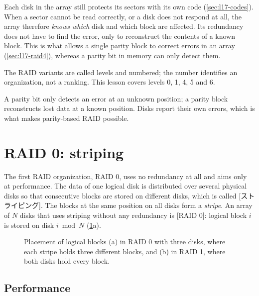 \documentclass[../main.tex]{subfiles}
\begin{document}
Each disk in the array still protects its sectors with its own code
(\cref{sec:l17-codes}).  When a sector cannot be read correctly, or a disk
does not respond at all, the array therefore \emph{knows which} disk and
which block are affected.  Its redundancy does not have to find the error,
only to reconstruct the contents of a known block.  This is what allows a
single parity block to correct errors in an array (\cref{sec:l17-raid4}),
whereas a parity bit in memory can only detect them.

The RAID variants are called levels and numbered; the number identifies an
organization, not a ranking.  This lesson covers levels 0, 1, 4, 5 and 6.

\begin{keypoint}
  A parity bit only detects an error at an unknown position; a parity block
  reconstructs lost data at a known position.  Disks report their own
  errors, which is what makes parity-based RAID possible.
\end{keypoint}

\section{RAID 0: striping}
\label{sec:l17-raid0}

The first RAID organization, RAID 0, uses no redundancy at all and aims only
at performance.  The data of one
logical disk is distributed over several physical disks so that consecutive
blocks are stored on different disks, which is called
[ストライピング].  The blocks at the same position on all
disks form a \emph{stripe}.  An array of $N$ disks that uses striping without
any redundancy is [RAID 0]: logical block $i$ is stored on disk
$i \bmod N$ (\cref{fig:l17-raid01}a).

\begin{figure}[htbp]
  \centering
  
  \caption{Placement of logical blocks (a) in RAID 0 with three disks, where
    each stripe holds three different blocks, and (b) in RAID 1, where both
    disks hold every block.}
  \label{fig:l17-raid01}
\end{figure}

\subsection{Performance}
\end{document}
